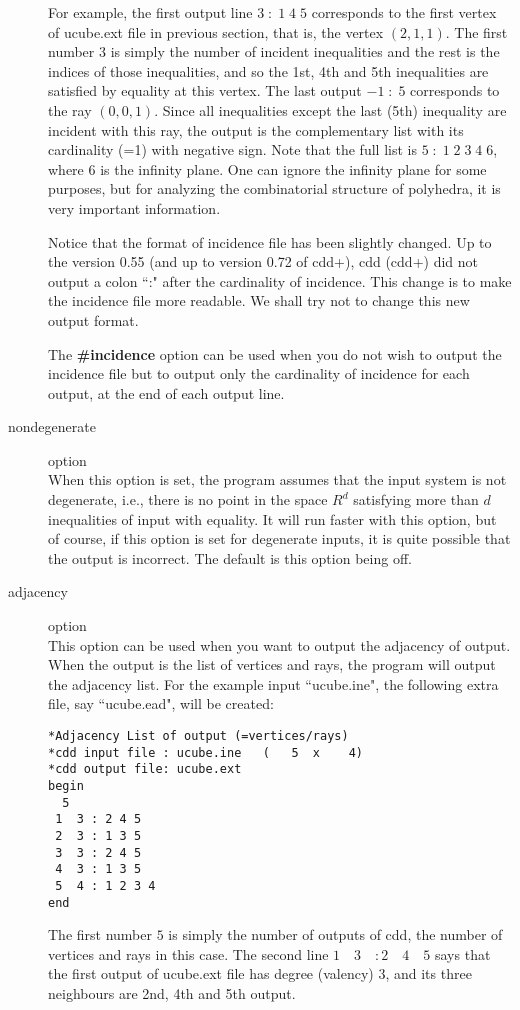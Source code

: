 \begin{description}
For example, the first output line $3 \; : \;1 \; 4 \; 5$ 
corresponds to the
first vertex of ucube.ext file in previous section, that is, 
the vertex $(2, 1, 1)$.  The first number $3$ is simply the number
of incident inequalities and the rest is the indices of
those inequalities, and so the 1st, 4th and 5th inequalities are
satisfied by equality at this vertex.   The last output
$-1 \; : \; 5$ corresponds to the ray  $(0,0,1)$.  Since all inequalities
except the last (5th) inequality are incident with this ray,
the output is the complementary list with its cardinality (=1) with negative
sign.  Note that the full list is $5 \; : \; 1 \; 2 \; 3 \; 4 \; 6$, where
$6$ is the infinity plane.  One can ignore the infinity
plane for some purposes,  but for analyzing the combinatorial 
structure of polyhedra, it is
very important information.

Notice that the format of incidence file has been slightly changed.
Up to the version 0.55 (and up to version 0.72 of cdd+), 
cdd (cdd+) did not output a colon ``:" after
the cardinality of incidence.  This change is to make the incidence
file more readable.  We shall try not to change this new output format.

The {\bf \#incidence} option can be used when you do not wish
to output the incidence file but to output only the cardinality of incidence
for each output, at the end of each output line.


\item[nondegenerate] option\\
When this option is set, the program assumes that the input system
is not degenerate, i.e., there is no point in the space $R^d$ satisfying
more than $d$ inequalities of input with equality.
It will run faster with this option, but of course, 
if this option is set for degenerate inputs, it is 
quite possible that the output is incorrect.  
The default is this option being off.

\item[adjacency] option\\
This option can be used when you want to output the adjacency of output.
When the output is the list of vertices and rays, the program will
output the adjacency list.  For the example input ``ucube.ine",
the following extra file, say ``ucube.ead", will be created:
\begin{verbatim}
*Adjacency List of output (=vertices/rays)
*cdd input file : ucube.ine   (   5  x    4)
*cdd output file: ucube.ext
begin
  5
 1  3 : 2 4 5
 2  3 : 1 3 5
 3  3 : 2 4 5
 4  3 : 1 3 5
 5  4 : 1 2 3 4
end
\end{verbatim}
The first number $5$ is simply the number of outputs of cdd, the
number of vertices and rays in this case.
The second line $ 1 \quad  3 \quad : 2 \quad  4 \quad  5$ says 
that the first output of
ucube.ext file has degree (valency) $3$, and its three neighbours are
2nd, 4th and 5th output.


\end{description}
